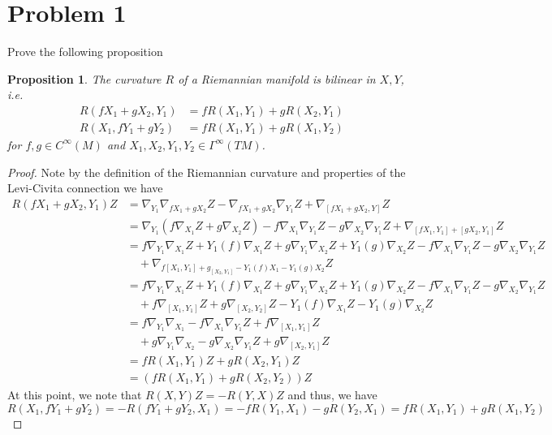 \documentclass[a4paper]{article}
\newtheorem*{prop}{Proposition}
\begin{document}
\section*{Problem 1}%
Prove the following proposition
\begin{prop}
 The curvature $R$ of a Riemannian manifold is bilinear in $X,Y$, i.e.
 \[
   \begin{aligned}
     R(fX_1 + gX_2, Y_1) &= fR(X_1,Y_1) + gR(X_2, Y_1) \\
     R(X_1, fY_1 + gY_2) &= fR(X_1,Y_1) + gR(X_1,Y_2)
   \end{aligned}
 \]
 for $f,g \in C^{\infty}(M)$ and $X_1,X_2,Y_1,Y_2 \in \Gamma^{\infty}(TM)$.
\end{prop}

\begin{proof}
  Note by the definition of the Riemannian curvature and properties of the Levi-Civita connection we have
  \[
    \begin{aligned}
      R(fX_1 + gX_2, Y_1)Z &= \nabla_{Y_1} \nabla_{fX_1 + gX_2}Z - \nabla_{fX_1 + gX_2} \nabla_{Y_1} Z + \nabla_{[fX_1 + gX_2,Y]}Z \\
                           &= \nabla_{Y_1} \left( f\nabla_{X_1}Z + g\nabla_{X_2}Z\right) - f \nabla_{X_1}\nabla_{Y_1} Z  - g\nabla_{X_2}\nabla_{Y_1} Z + \nabla_{[fX_1,Y_1] + [gX_2, Y_1]} Z \\
                           &= f\nabla_{Y_1}\nabla_{X_1}Z + Y_1(f)\nabla_{X_1} Z + g\nabla_{Y_1}\nabla_{X_2}Z + Y_1(g)\nabla_{X_2}Z - f \nabla_{X_1}\nabla_{Y_1} Z  - g\nabla_{X_2}\nabla_{Y_1} Z \\
                           &\quad +  \nabla_{f[X_1, Y_1] + g_[X_2, Y_1] - Y_1(f)X_1 - Y_1(g)X_2}Z \\
                           &= f\nabla_{Y_1}\nabla_{X_1}Z + Y_1(f)\nabla_{X_1} Z + g\nabla_{Y_1}\nabla_{X_2}Z + Y_1(g)\nabla_{X_2}Z - f \nabla_{X_1}\nabla_{Y_1} Z  - g\nabla_{X_2}\nabla_{Y_1} Z \\
                           &\quad +  f\nabla_{[X_1,Y_1]}Z + g\nabla_{[X_2, Y_2]}Z - Y_1(f) \nabla_{X_1}Z - Y_1(g) \nabla_{X_2}Z \\
                           &= f \nabla_{Y_1}\nabla_{X_1} - f \nabla_{X_1} \nabla_{Y_1} Z + f \nabla_{[X_1,Y_1]} Z \\
                           &\quad + g \nabla_{Y_1}\nabla_{X_2} - g \nabla_{X_2} \nabla_{Y_1} Z + g \nabla_{[X_2,Y_1]} Z \\
                           &= f R(X_1, Y_1)Z + gR(X_2, Y_1)Z \\
                           &= \left( f R(X_1, Y_1) + gR(X_2, Y_2) \right)Z
    \end{aligned}
  \]
  At this point, we note that $R(X,Y)Z = -R(Y,X)Z$ and thus, we have
  \[
    R(X_1, fY_1 + gY_2) = -R(fY_1 + gY_2, X_1) = -fR(Y_1, X_1) - gR(Y_2, X_1) = fR(X_1, Y_1) + g R(X_1, Y_2)
  \]
\end{proof}
\end{document}
